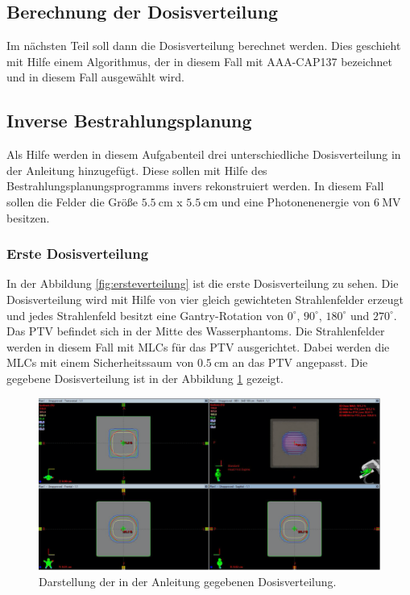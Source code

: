 \subsection{Berechnung der Dosisverteilung}
\label{subsec:Dosisverteilung}
Im nächsten Teil soll dann die Dosisverteilung berechnet werden. Dies geschieht mit Hilfe einem Algorithmus, der in diesem Fall mit AAA-CAP137 bezeichnet und in diesem Fall ausgewählt wird.

\subsection{Inverse Bestrahlungsplanung}
\label{subsec:inversebestrahlung}
Als Hilfe werden in diesem Aufgabenteil drei unterschiedliche Dosisverteilung in der Anleitung hinzugefügt. Diese sollen mit Hilfe des Bestrahlungsplanungsprogramms invers rekonstruiert werden. In diesem Fall sollen die Felder die Größe $\SI{5,5}{\centi\meter}$ x $\SI{5,5}{\centi\meter}$ und eine Photonenenergie von $\SI{6}{\mega\volt}$ besitzen.

\subsubsection{Erste Dosisverteilung}
In der Abbildung \ref{fig:ersteverteilung} ist die erste Dosisverteilung zu sehen. Die Dosisverteilung wird mit Hilfe von vier gleich gewichteten Strahlenfelder erzeugt und jedes Strahlenfeld besitzt eine Gantry-Rotation von $0^\circ$, $90^\circ$, $180^\circ$ und $270^\circ$. Das PTV befindet sich in der Mitte des Wasserphantoms. Die Strahlenfelder werden in diesem Fall mit MLCs für das PTV ausgerichtet. Dabei werden die MLCs mit einem Sicherheitssaum von $\SI{0.5}{\centi\meter}$ an das PTV angepasst. Die gegebene Dosisverteilung ist in der Abbildung \ref{abb:ersteverteilung} gezeigt.

\begin{figure}[H]
	\centering
	\includegraphics[width=0.7\linewidth]{../../Wasserphantom Bilder/AnleitungersteVerteilung.png}
	\caption{Darstellung der in der Anleitung gegebenen Dosisverteilung. \cite{Anleitung}}
	\label{abb:ersteverteilung}
\end{figure}

